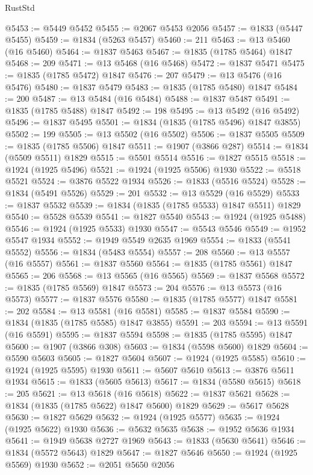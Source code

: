 \begin{lexlean}{RustStd}
\begin{coremodule}
@5453 := @5449 @5452
@5455 := @2067 @5453 @2056
@5457 := @1833 (@5447 @5455)
@5459 := @1834 (@5263 @5457)
@5460 := 211
@5463 := @13 @5460 (@16 @5460)
@5464 := @1837 @5463
@5467 := @1835 (@1785 @5464) @1847
@5468 := 209
@5471 := @13 @5468 (@16 @5468)
@5472 := @1837 @5471
@5475 := @1835 (@1785 @5472) @1847
@5476 := 207
@5479 := @13 @5476 (@16 @5476)
@5480 := @1837 @5479
@5483 := @1835 (@1785 @5480) @1847
@5484 := 200
@5487 := @13 @5484 (@16 @5484)
@5488 := @1837 @5487
@5491 := @1835 (@1785 @5488) @1847
@5492 := 198
@5495 := @13 @5492 (@16 @5492)
@5496 := @1837 @5495
@5501 := @1834 (@1835 (@1785 @5496) @1847 @3855)
@5502 := 199
@5505 := @13 @5502 (@16 @5502)
@5506 := @1837 @5505
@5509 := @1835 (@1785 @5506) @1847
@5511 := @1907 (@3866 @287)
@5514 := @1834 (@5509 @5511) @1829
@5515 := @5501 @5514
@5516 := @1827 @5515
@5518 := @1924 (@1925 @5496)
@5521 := @1924 (@1925 @5506) @1930
@5522 := @5518 @5521
@5524 := @3876 @5522 @1934
@5526 := @1833 (@5516 @5524)
@5528 := @1834 (@5491 @5526)
@5529 := 201
@5532 := @13 @5529 (@16 @5529)
@5533 := @1837 @5532
@5539 := @1834 (@1835 (@1785 @5533) @1847 @5511) @1829
@5540 := @5528 @5539
@5541 := @1827 @5540
@5543 := @1924 (@1925 @5488)
@5546 := @1924 (@1925 @5533) @1930
@5547 := @5543 @5546
@5549 := @1952 @5547 @1934
@5552 := @1949 @5549 @2635 @1969
@5554 := @1833 (@5541 @5552)
@5556 := @1834 (@5483 @5554)
@5557 := 208
@5560 := @13 @5557 (@16 @5557)
@5561 := @1837 @5560
@5564 := @1835 (@1785 @5561) @1847
@5565 := 206
@5568 := @13 @5565 (@16 @5565)
@5569 := @1837 @5568
@5572 := @1835 (@1785 @5569) @1847
@5573 := 204
@5576 := @13 @5573 (@16 @5573)
@5577 := @1837 @5576
@5580 := @1835 (@1785 @5577) @1847
@5581 := 202
@5584 := @13 @5581 (@16 @5581)
@5585 := @1837 @5584
@5590 := @1834 (@1835 (@1785 @5585) @1847 @3855)
@5591 := 203
@5594 := @13 @5591 (@16 @5591)
@5595 := @1837 @5594
@5598 := @1835 (@1785 @5595) @1847
@5600 := @1907 (@3866 @308)
@5603 := @1834 (@5598 @5600) @1829
@5604 := @5590 @5603
@5605 := @1827 @5604
@5607 := @1924 (@1925 @5585)
@5610 := @1924 (@1925 @5595) @1930
@5611 := @5607 @5610
@5613 := @3876 @5611 @1934
@5615 := @1833 (@5605 @5613)
@5617 := @1834 (@5580 @5615)
@5618 := 205
@5621 := @13 @5618 (@16 @5618)
@5622 := @1837 @5621
@5628 := @1834 (@1835 (@1785 @5622) @1847 @5600) @1829
@5629 := @5617 @5628
@5630 := @1827 @5629
@5632 := @1924 (@1925 @5577)
@5635 := @1924 (@1925 @5622) @1930
@5636 := @5632 @5635
@5638 := @1952 @5636 @1934
@5641 := @1949 @5638 @2727 @1969
@5643 := @1833 (@5630 @5641)
@5646 := @1834 (@5572 @5643) @1829
@5647 := @1827 @5646
@5650 := @1924 (@1925 @5569) @1930
@5652 := @2051 @5650 @2056

\end{coremodule}
\end{lexlean}
